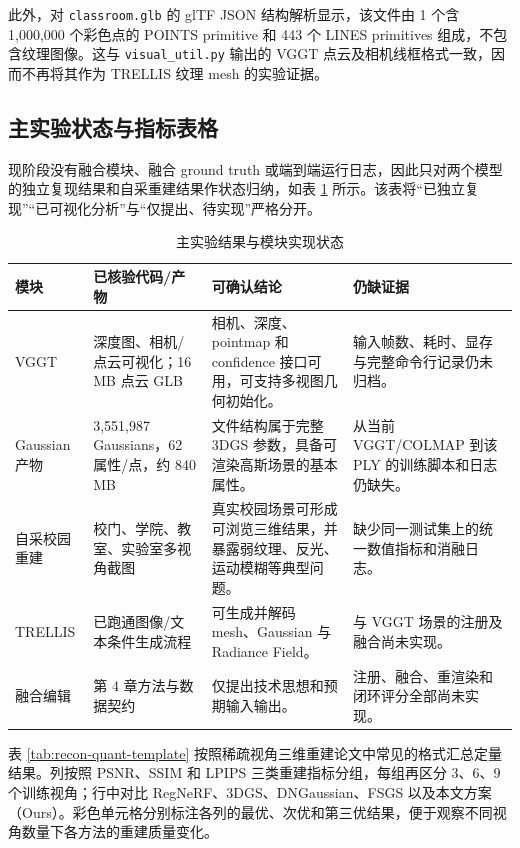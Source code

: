 此外，对 \texttt{classroom.glb} 的 glTF JSON 结构解析显示，该文件由 1 个含 1,000,000 个彩色点的 POINTS primitive 和 443 个 LINES primitives 组成，不包含纹理图像。这与 \texttt{visual\_util.py} 输出的 VGGT 点云及相机线框格式一致，因而不再将其作为 TRELLIS 纹理 mesh 的实验证据。

\subsection{主实验状态与指标表格}

现阶段没有融合模块、融合 ground truth 或端到端运行日志，因此只对两个模型的独立复现结果和自采重建结果作状态归纳，如表 \ref{tab:main-results} 所示。该表将“已独立复现”“已可视化分析”与“仅提出、待实现”严格分开。

\begin{table}[H]
  \centering
  \caption{主实验结果与模块实现状态}
  \label{tab:main-results}
  \footnotesize
  \renewcommand{\arraystretch}{1.08}
  \begin{tabularx}{\linewidth}{>{\raggedright\arraybackslash}p{2.5cm} p{3.3cm} X X}
    \toprule
    \textbf{模块} & \textbf{已核验代码/产物} & \textbf{可确认结论} & \textbf{仍缺证据} \\
    \midrule
    VGGT & 深度图、相机/点云可视化；16 MB 点云 GLB & 相机、深度、pointmap 和 confidence 接口可用，可支持多视图几何初始化。 & 输入帧数、耗时、显存与完整命令行记录仍未归档。 \\
    Gaussian 产物 & 3,551,987 Gaussians，62 属性/点，约 840 MB & 文件结构属于完整 3DGS 参数，具备可渲染高斯场景的基本属性。 & 从当前 VGGT/COLMAP 到该 PLY 的训练脚本和日志仍缺失。 \\
    自采校园重建 & 校门、学院、教室、实验室多视角截图 & 真实校园场景可形成可浏览三维结果，并暴露弱纹理、反光、运动模糊等典型问题。 & 缺少同一测试集上的统一数值指标和消融日志。 \\
    TRELLIS & 已跑通图像/文本条件生成流程 & 可生成并解码 mesh、Gaussian 与 Radiance Field。 & 与 VGGT 场景的注册及融合尚未实现。 \\
    融合编辑 & 第 4 章方法与数据契约 & 仅提出技术思想和预期输入输出。 & 注册、融合、重渲染和闭环评分全部尚未实现。 \\
    \bottomrule
  \end{tabularx}
\end{table}

表 \ref{tab:recon-quant-template} 按照稀疏视角三维重建论文中常见的格式汇总定量结果。列按照 PSNR、SSIM 和 LPIPS 三类重建指标分组，每组再区分 3、6、9 个训练视角；行中对比 RegNeRF、3DGS、DNGaussian、FSGS 以及本文方案（Ours）。彩色单元格分别标注各列的最优、次优和第三优结果，便于观察不同视角数量下各方法的重建质量变化。

